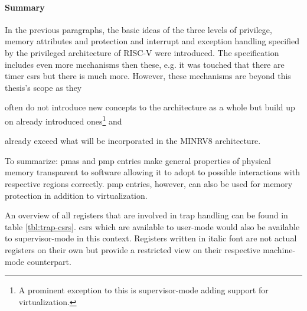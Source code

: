 \paragraph{Summary}
In the previous paragraphs, the basic ideas of the three levels of privilege, memory attributes and protection and interrupt and exception handling specified by the privileged architecture of RISC-V \cite{RiscVISAP} were introduced.
The specification includes even more mechanisms then these, e.g. it was touched that there are timer \glspl{csr} but there is much more.
However, these mechanisms are beyond this thesis's scope as they \begin{enumerate*}[label=\alph*)]
    \item often do not introduce new concepts to the architecture as a whole but build up on already introduced ones\footnote{%
        A prominent exception to this is supervisor-mode adding support for virtualization.
    } and
    \item already exceed what will be incorporated in the MINRV8 architecture.
\end{enumerate*}

To summarize:
\glspl{pma} and \gls{pmp} entries make general properties of physical memory transparent to software allowing it to adopt to possible interactions with respective regions correctly.
\gls{pmp} entries, however, can also be used for memory protection in addition to virtualization.

An overview of all registers that are involved in trap handling can be found in table \ref{tbl:trap-csrs}.
\glspl{csr} which are available to user-mode would also be available to supervisor-mode in this context.
Registers written in italic font are not actual registers on their own but provide a restricted view on their respective machine-mode counterpart.


